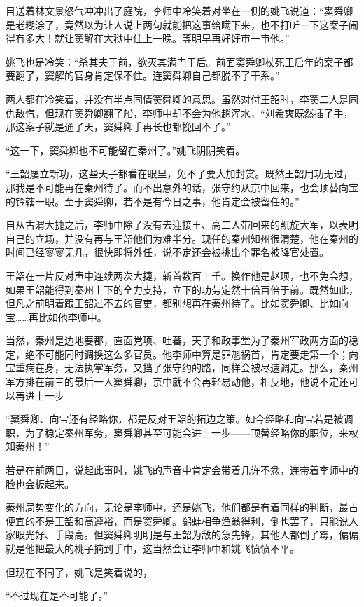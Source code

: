 目送着林文景怒气冲冲出了庭院，李师中冷笑着对坐在一侧的姚飞说道：“窦舜卿是老糊涂了，竟然以为让人说上两句就能把这事给瞒下来，也不打听一下这案子闹得有多大！就让窦解在大狱中住上一晚。等明早再好好审一审他。”

姚飞也是冷笑：“杀其夫于前，欲灭其满门于后。前面窦舜卿杖死王启年的案子都要翻了，窦解的官身肯定保不住。连窦舜卿自己都脱不了干系。”

两人都在冷笑着，并没有半点同情窦舜卿的意思。虽然对付王韶时，李窦二人是同仇敌忾，但现在窦舜卿翻了船，李师中却不会为他趟浑水，“刘希奭既然插了手，那这案子就是通了天，窦舜卿手再长也都挽回不了。”

“这一下，窦舜卿也不可能留在秦州了。”姚飞阴阴笑着。

“王韶屡立新功，这些天子都看在眼里，免不了要大加封赏。既然王韶用功无过，那我是不可能再在秦州待了。而不出意外的话，张守约从京中回来，也会顶替向宝的钤辖一职。至于窦舜卿，若不是有今日之事，他肯定会被留任的。”

自从古渭大捷之后，李师中除了没有去迎接王、高二人带回来的凯旋大军，以表明自己的立场，并没有再与王韶他们为难半分。现任的秦州知州很清楚，他在秦州的时间已经寥寥无几，很快即将外任，说不定还会被挑出个罪名被降官处置。

王韶在一片反对声中连续两次大捷，斩首数百上千。换作他是赵顼，也不免会想，如果王韶能得到秦州上下的全力支持，立下的功劳定然十倍百倍于前。既然如此，但凡之前明着跟王韶过不去的官吏，都别想再在秦州待了。比如窦舜卿、比如向宝……再比如他李师中。

当然，秦州是边地要郡，直面党项、吐蕃，天子和政事堂为了秦州军政两方面的稳定，绝不可能同时调换这么多官员。他李师中算是罪魁祸首，肯定要走第一个；向宝重病在身，无法执掌军务，又挡了张守约的路，同样会被尽速调走。那么，秦州军方排在前三的最后一人窦舜卿，京中就不会再轻易动他，相反地，他说不定还可以再进上一步——

“窦舜卿、向宝还有经略你，都是反对王韶的拓边之策。如今经略和向宝若是被调职，为了稳定秦州军务，窦舜卿甚至可能会进上一步——顶替经略你的职位，来权知秦州！”

若是在前两日，说起此事时，姚飞的声音中肯定会带着几许不忿，连带着李师中的脸也会板起来。

秦州局势变化的方向，无论是李师中，还是姚飞，他们都是有着同样的判断，最占便宜的不是王韶和高遵裕，而是窦舜卿。鹬蚌相争渔翁得利，倒也罢了，只能说人家眼光好、手段高。但窦舜卿明明是与王韶为敌的急先锋，其他人都倒了霉，偏偏就是他把最大的桃子摘到手中，这当然会让李师中和姚飞愤愤不平。

但现在不同了，姚飞是笑着说的，

“不过现在是不可能了。”

